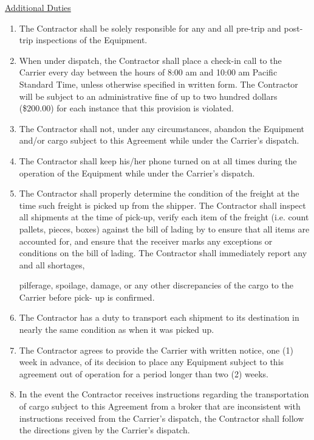 \underline{Additional Duties}
\begin{enumerate}
    \item The Contractor shall be solely responsible for any and all
    pre-trip and post-trip inspections of the Equipment.

    \item When under dispatch, the Contractor shall place a check-in call
    to the Carrier every day between the hours of 8:00 am and 10:00 am
    Pacific Standard Time, unless otherwise specified in written form. The
    Contractor will be subject to an administrative fine of up to two
    hundred dollars (\$200.00) for each instance that this provision is
    violated.
    
    \item The Contractor shall not, under any circumstances, abandon the
    Equipment and/or cargo subject to this Agreement while under the
    Carrier's dispatch.
    \item The Contractor shall keep his/her phone turned on at all times
    during the operation of the Equipment while under the Carrier's
    dispatch.
    \item The Contractor shall properly determine the condition of the
    freight at the time such freight is picked up from the shipper. The
    Contractor shall inspect all shipments at the time of pick-up, verify
    each item of the freight (i.e. count pallets, pieces, boxes) against
    the bill of lading by to ensure that all items are accounted for, and
    ensure that the receiver marks any exceptions or conditions on the bill
    of lading. The Contractor shall immediately report any and all
    shortages,

    pilferage, spoilage, damage, or any other discrepancies of the cargo to
    the Carrier before pick- up is confirmed.

    \item The Contractor has a duty to transport each shipment to its
    destination in nearly the same condition as when it was picked up.
    \item The Contractor agrees to provide the Carrier with written notice,
    one (1) week in advance, of its decision to place any Equipment subject
    to this agreement out of operation for a period longer than two (2)
    weeks.
    \item In the event the Contractor receives instructions regarding the
    transportation of cargo subject to this Agreement from a broker that
    are inconsistent with instructions received from the Carrier's
    dispatch, the Contractor shall follow the directions given by the
    Carrier's dispatch.
\end{enumerate}